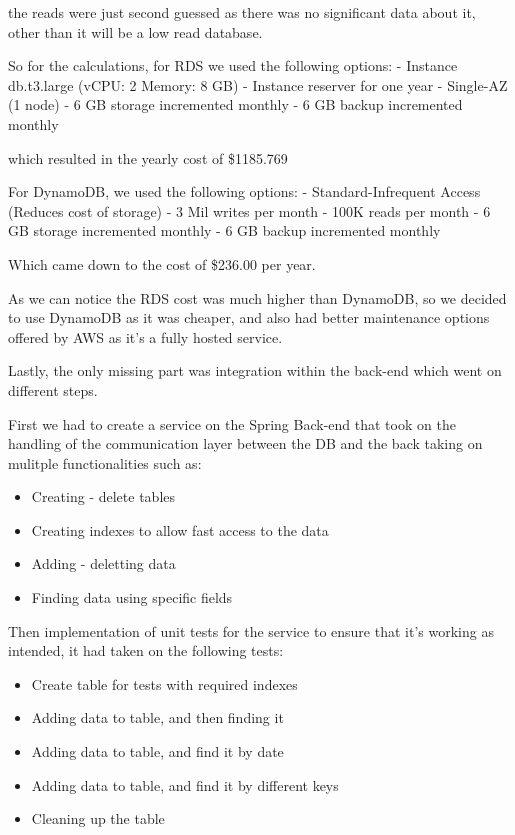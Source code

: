 the reads were just second guessed as there was no significant data about it, 
other than it will be a low read database.

So for the calculations, for RDS we used the following options:
- Instance db.t3.large (vCPU: 2 Memory: 8 GB)
- Instance reserver for one year 
- Single-AZ (1 node)
- 6 GB storage incremented monthly
- 6 GB backup incremented monthly

which resulted in the yearly cost of \$1185.769

For DynamoDB, we used the following options:
- Standard-Infrequent Access (Reduces cost of storage)
- 3 Mil writes per month
- 100K reads per month
- 6 GB storage incremented monthly
- 6 GB backup incremented monthly

Which came down to the cost of \$236.00 per year.

As we can notice the RDS cost was much higher than DynamoDB,
so we decided to use DynamoDB as it was cheaper, and also had
better maintenance options offered by AWS as it's a fully hosted
service.

Lastly, the only missing part was integration within the back-end which went on different steps.

First we had to create a service on the Spring Back-end that took on the handling of the communication layer between the DB and the back taking on mulitple functionalities such as:

    \begin{itemize}
        \item Creating - delete tables
        \item Creating indexes to allow fast access to the data
        \item Adding - deletting data
        \item Finding data using specific fields
    \end{itemize}

Then implementation of unit tests for the service to ensure that it's working as intended,
it had taken on the following tests:

    \begin{itemize}
        \item Create table for tests with required indexes
        \item Adding data to table, and then finding it
        \item Adding data to table, and find it by date
        \item Adding data to table, and find it by different keys
        \item Cleaning up the table
    \end{itemize}

